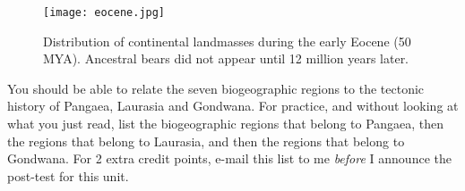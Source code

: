 \documentclass[11pt, oneside]{article}   	%
\begin{document}
\begin{figure}[tb]
	\centering
		\texttt{[image: eocene.jpg]}  
		\caption{Distribution of continental landmasses during the early Eocene (50 MYA). Ancestral bears did not appear until 12 million years later.\label{Eocene Map}}
		
\end{figure}


You should be able to relate the seven biogeographic regions to the tectonic history of Pangaea, Laurasia and Gondwana. For practice, and without looking at what you just read, list the biogeographic regions that belong to Pangaea, then the regions that belong to Laurasia, and then the regions that belong to Gondwana. For 2 extra credit points, e-mail this list to me \emph{before} I announce the post-test for this unit.
\end{document}
